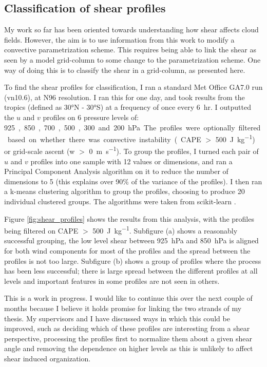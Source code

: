 \documentclass[11pt,a4paper]{article}
\begin{document}
\subsection{Classification of shear profiles}
\label{sec:Classification of shear profiles}

My work so far has been oriented towards understanding how shear affects cloud fields. However, the aim is to use information from this work to modify a convective parametrization scheme. This requires being able to link the shear as seen by a model grid-column to some change to the parametrization scheme. One way of doing this is to classify the shear in a grid-column, as presented here.

To find the shear profiles for classification, I ran a standard Met Office GA7.0 run (vn10.6), at N96 resolution. I ran this for one day, and took results from the tropics (defined as \ang{30}N - \ang{30}S) at a frequency of once every \SI{6}{hr}. I outputted the $u$ and $v$ profiles on 6 pressure levels of: \SI{925}, \SI{850}, \SI{700}, \SI{500}, \SI{300} and \SI{200}{hPa}. The profiles were optionally filtered based on whether there was convective instability (CAPE $>$ \SI{500}{J.kg^{-1}}) or grid-scale ascent (w $>$ \SI{0}{m.s^{-1}}). To group the profiles, I turned each pair of $u$ and $v$ profiles into one sample with 12 values or dimensions, and ran a Principal Component Analysis algorithm on it to reduce the number of dimensions to 5 (this explains over 90\% of the variance of the profiles). I then ran a k-means clustering algorithm to group the profiles, choosing to produce 20 individual clustered groups. The algorithms were taken from scikit-learn \parencite{scikit-learn}.

Figure \ref{fig:shear_profiles} shows the results from this analysis, with the profiles being filtered on CAPE $>$ \SI{500}{J.kg^{-1}}. Subfigure (a) shows a reasonably successful grouping, the low level shear between \SI{925}{hPa} and \SI{850}{hPa} is aligned for both wind components for most of the profiles and the spread between the profiles is not too large. Subfigure (b) shows a group of profiles where the process has been less successful; there is large spread between the different profiles at all levels and important features in some profiles are not seen in others.

This is a work in progress. I would like to continue this over the next couple of months because I believe it holds promise for linking the two strands of my thesis. My supervisors and I have discussed ways in which this could be improved, such as deciding which of these profiles are interesting from a shear perspective, processing the profiles first to normalize them about a given shear angle and removing the dependence on higher levels as this is unlikely to affect shear induced organization.
\end{document}
